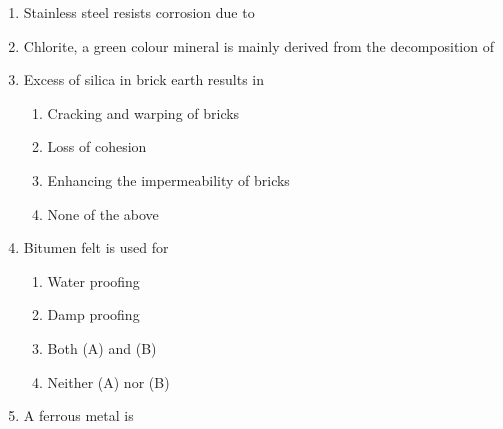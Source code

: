 \documentclass[11pt,a4paper]{article}
\begin{document}
\begin{enumerate}
\item{Stainless steel resists corrosion due to}
\\
\item{Chlorite, a green colour mineral is mainly derived from the decomposition of}
\\
\item{Excess of silica in brick earth results in}
\begin{enumerate}[label=\Alph*.]
\item{Cracking and warping of bricks}
\item{Loss of cohesion}
\item{Enhancing the impermeability of bricks}
\item{None of the above}
\end{enumerate}
\item{Bitumen felt is used for}
\begin{enumerate}[label=\Alph*.]
\item{Water proofing}
\item{Damp proofing}
\item{Both (A) and (B)}
\item{Neither (A) nor (B)}
\end{enumerate}
\item{A ferrous metal is}
\\
\end{enumerate}
\end{document}
